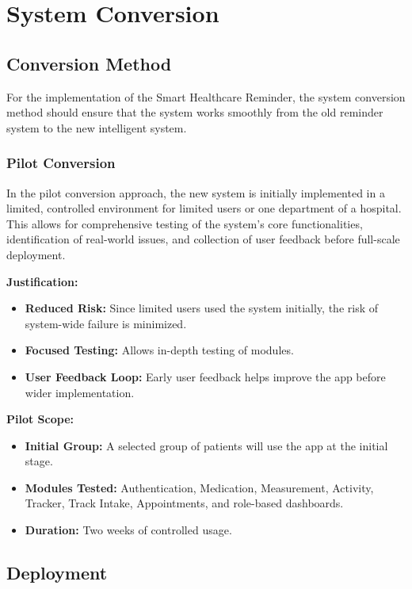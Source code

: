 \chapter{System Conversion}
\label{ch:conversion}

\section{Conversion Method}

For the implementation of the Smart Healthcare Reminder, the system conversion method should ensure that the system works smoothly from the old reminder system to the new intelligent system.

\subsection{Pilot Conversion}
In the pilot conversion approach, the new system is initially implemented in a limited, controlled environment for limited users or one department of a hospital. This allows for comprehensive testing of the system's core functionalities, identification of real-world issues, and collection of user feedback before full-scale deployment.

\textbf{Justification:}
\begin{itemize}
    \item \textbf{Reduced Risk:} Since limited users used the system initially, the risk of system-wide failure is minimized.
    \item \textbf{Focused Testing:} Allows in-depth testing of modules.
    \item \textbf{User Feedback Loop:} Early user feedback helps improve the app before wider implementation.
\end{itemize}

\textbf{Pilot Scope:}
\begin{itemize}
    \item \textbf{Initial Group:} A selected group of patients will use the app at the initial stage.
    \item \textbf{Modules Tested:} Authentication, Medication, Measurement, Activity, Tracker, Track Intake, Appointments, and role-based dashboards.
    \item \textbf{Duration:} Two weeks of controlled usage.
\end{itemize}

\section{Deployment}

